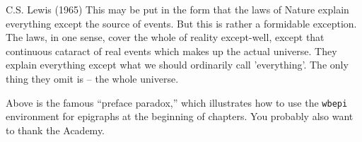\begin{wbepi}{C.S. Lewis (1965)}
This may be put in the form that the laws of Nature explain everything except the source of events. But this is rather a formidable exception. The laws, in one sense, cover the whole of reality except-well, except that continuous cataract of real events which makes up the actual universe. They explain everything except what we should ordinarily call 'everything'. The only thing they omit is -- the whole universe.
\end{wbepi}

Above is the famous ``preface paradox,'' which illustrates how to use the \texttt{wbepi} environment for epigraphs at the beginning of chapters.  You probably also want to thank the Academy.